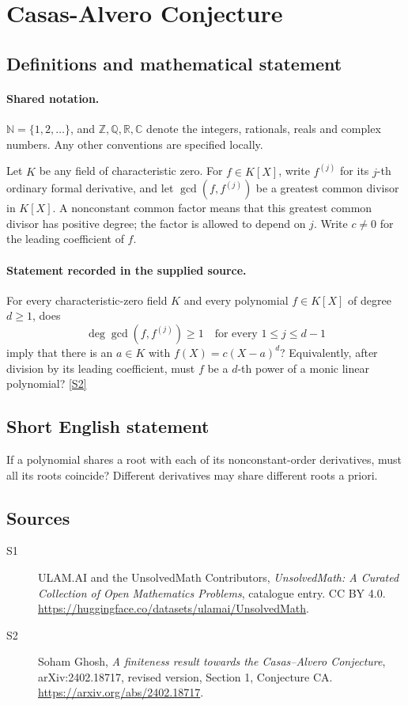 \documentclass[11pt]{article}
\newcommand{\sref}[2]{\hyperlink{source:#1:#2}{[S#2]}}
\begin{document}
\section{Casas-Alvero Conjecture}\label{statement}

\subsection{Definitions and mathematical statement}

\paragraph{Shared notation.}$\mathbb N=\{1,2,\ldots\}$, and $\mathbb Z,\mathbb Q,\mathbb R,\mathbb C$ denote the integers, rationals, reals and complex numbers. Any other conventions are specified locally.


Let \(K\) be any field of characteristic zero.  For \(f\in K[X]\), write
\(f^{(j)}\) for its \(j\)-th ordinary formal derivative, and let
\(\gcd(f,f^{(j)})\) be a greatest common divisor in \(K[X]\).
A nonconstant common factor means that this greatest common divisor has
positive degree; the factor is allowed to depend on \(j\).
Write \(c\ne0\) for the leading coefficient of \(f\).
\paragraph{Statement recorded in the supplied source.}
For every characteristic-zero field \(K\) and every polynomial
\(f\in K[X]\) of degree \(d\ge1\), does
\[
 \deg\gcd(f,f^{(j)})\ge1\quad\text{for every }1\le j\le d-1
\]
imply that there is an \(a\in K\) with \(f(X)=c(X-a)^d\)?
Equivalently, after division by its leading coefficient, must \(f\)
be a \(d\)-th power of a monic linear polynomial? \sref{statement}{2}
\subsection{Short English statement}
If a polynomial shares a root with each of its nonconstant-order derivatives, must all its roots coincide? Different derivatives may share different roots a priori.
\subsection{Sources}
\begin{description}
\item[\hypertarget{source:statement:1}{S1}] ULAM.AI and the UnsolvedMath Contributors, \emph{UnsolvedMath: A Curated Collection of Open Mathematics Problems}, catalogue entry. CC BY 4.0. \url{https://huggingface.co/datasets/ulamai/UnsolvedMath}.
\item[\hypertarget{source:statement:2}{S2}] Soham Ghosh, \emph{A finiteness result towards the Casas--Alvero Conjecture}, arXiv:2402.18717, revised version, Section 1, Conjecture CA. \url{https://arxiv.org/abs/2402.18717}.
\end{description}
\label{end:statement}
\end{document}
